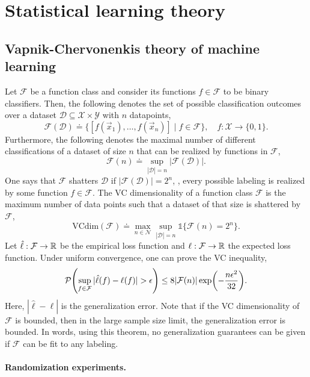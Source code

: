 \section{Statistical learning theory}

\subsection{Vapnik-Chervonenkis theory of machine learning}

Let $\mathcal{F}$ be a function class and consider its functions $f \in \mathcal{F}$ to be binary
classifiers. Then, the following denotes the set of possible classification outcomes over a dataset
$\mathcal{D} \subseteq \mathcal{X} \times \mathcal{Y}$ with $n$ datapoints, \[
    \mathcal{F}(\mathcal{D}) \doteq \{ [f(\vec{x}_1), \ldots, f(\vec{x}_n)] \mid f \in \mathcal{F} \}, \quad f: \mathcal{X} \to \{ 0,1 \}.
\]
Furthermore, the following denotes the maximal number of different classifications of a dataset of
size $n$ that can be realized by functions in $\mathcal{F}$, \[
    \mathcal{F}(n) \doteq \sup_{|\mathcal{D}| = n} | \mathcal{F}(\mathcal{D}) |.
\]
One says that $\mathcal{F}$ shatters $\mathcal{D}$ if $|\mathcal{F}(\mathcal{D})| = 2^n$, \ie,
every possible labeling is realized by some function $f \in \mathcal{F}$. The VC dimensionality of
a function class $\mathcal{F}$ is the maximum number of data points such that a dataset of that
size is shattered by $\mathcal{F}$, \[
    \mathrm{VCdim}(\mathcal{F}) \doteq \max_{n\in \mathcal{N}} \sup_{|\mathcal{D}|=n} \mathbb{1}\{ \mathcal{F}(n) = 2^n \}.
\]
Let $\hat{\ell}: \mathcal{F} \to \mathbb{R}$ be the empirical loss function and $\ell: \mathcal{F} \to \mathbb{R}$
the expected loss function. Under uniform convergence, one can prove the VC inequality, \[
    \mathcal{P} \lft( \sup_{f \in \mathcal{F}} |\hat{\ell}(f) - \ell(f)| > \epsilon \rgt) \leq 8 |\mathcal{F}(n)| \exp \lft( -\frac{n \epsilon^2}{32} \rgt).
\]
Here, $|\hat{\ell} - \ell|$ is the generalization error. Note that if the VC dimensionality of
$\mathcal{F}$ is bounded, then in the large sample size limit, the generalization error is bounded.
In words, using this theorem, no generalization guarantees can be given if $\mathcal{F}$ can be fit
to any labeling.

\paragraph{Randomization experiments.}

